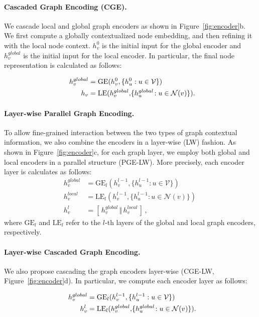 \documentclass[11pt,a4paper]{article}
\begin{document}
\paragraph{Cascaded Graph Encoding (CGE).} We cascade local and global graph encoders as shown in Figure~\ref{fig:encoder}b. We first compute a globally contextualized node embedding, and then refining it with the local node context. $h^{0}_v$ is the initial input for the global encoder and $h^{global}_{v}$ is the initial input for the local encoder. In particular, the final node representation is calculated as follows:

\begin{align}
h^{global}_{v} &= \textrm{GE} (h^{0}_v, \{ h^{0}_u : u \in \mathcal{V} \}) \, \nonumber \\
h_{v} &= \textrm{LE} (h^{global}_v,\!\{ h^{global}_u\!: u \in \mathcal{N}(v) \}).\hspace{-.5em}
\end{align}

\paragraph{Layer-wise Parallel Graph Encoding.} To allow fine-grained interaction between the two types of graph contextual information, we also combine the encoders in a layer-wise (LW) fashion. As shown in Figure~\ref{fig:encoder}c, for each graph layer, we employ both global and local encoders in a parallel structure ({\selectfont PGE-LW}). More precisely, each encoder layer is calculates as follows: 
\begin{align}
h^{global}_{v} &= \textrm{GE}_{l} (h^{l - 1}_v, \{ h^{l - 1}_u : u \in \mathcal{V} \}) \, \nonumber \\
h^{local}_{v} &= \textrm{LE}_{l} (h^{l - 1}_v, \{ h^{l - 1}_u : u \in \mathcal{N}(v) \}) \, \nonumber \\
h^{l}_{v} &= [ \, h^{global}_{v} \, \Vert \, h^{local}_{v} \, ] \, ,
\end{align}
where $\textrm{GE}_{l}$ and $\textrm{LE}_{l}$ refer to the $l$-th layers of the global and local graph encoders, respectively.
\paragraph{Layer-wise Cascaded Graph Encoding.} We also propose cascading the graph encoders layer-wise ({\selectfont CGE-LW}, Figure~\ref{fig:encoder}d). In particular, we compute each encoder layer as follows: 
\begin{fleqn}
\begin{align}
h^{global}_{v} &= \textrm{GE}_{l} (h^{l - 1}_v, \{ h^{l - 1}_u : u \in \mathcal{V} \}) \, \nonumber \\
h^{l}_{v} &= \textrm{LE}_{l} (h^{global}_v,\!\{ h^{global}_u\!: u \in \mathcal{N}(v) \}).\hspace{-.5em}
\end{align}
\end{fleqn}
\end{document}
